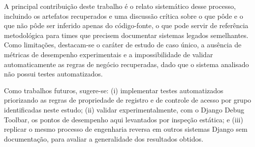 \documentclass[12pt]{article}
\begin{document}
A principal contribuição deste trabalho é o relato sistemático desse
processo, incluindo os artefatos recuperados e uma discussão crítica sobre
o que pôde e o que não pôde ser inferido apenas do código-fonte, o que pode
servir de referência metodológica para times que precisem documentar
sistemas legados semelhantes. Como limitações, destacam-se o caráter de
estudo de caso único, a ausência de métricas de desempenho experimentais e a
impossibilidade de validar automaticamente as regras de negócio recuperadas,
dado que o sistema analisado não possui testes automatizados.

Como trabalhos futuros, sugere-se: (i) implementar testes automatizados
priorizando as regras de propriedade de registro e de controle de acesso por
grupo identificadas neste estudo; (ii) validar experimentalmente, com o
Django Debug Toolbar, os pontos de desempenho aqui levantados por inspeção
estática; e (iii) replicar o mesmo processo de engenharia reversa em outros
sistemas Django sem documentação, para avaliar a generalidade dos resultados
obtidos.



\end{document}
